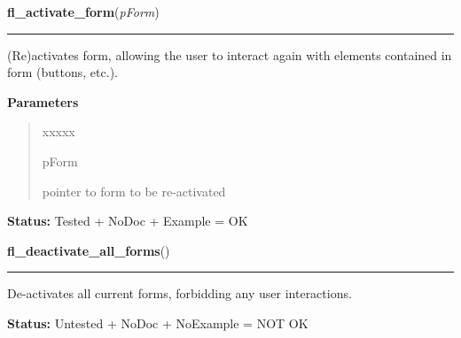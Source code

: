 \hspace{.8\funcindent}\begin{boxedminipage}{\funcwidth}

    \raggedright \textbf{fl\_activate\_form}(\textit{pForm})

    \vspace{-1.5ex}

    \rule{\textwidth}{0.5\fboxrule}
\setlength{\parskip}{2ex}
    (Re)activates form, allowing the user to interact again with elements 
    contained in form (buttons, etc.).

\setlength{\parskip}{1ex}
      \textbf{Parameters}
      \vspace{-1ex}

      \begin{quote}
        \begin{Ventry}{xxxxx}

          \item[pForm]

          pointer to form to be re-activated

        \end{Ventry}

      \end{quote}

\textbf{Status:} Tested + NoDoc + Example = OK



    \end{boxedminipage}

    \label{xformslib:library:fl_deactivate_all_forms}

    \vspace{0.5ex}

\hspace{.8\funcindent}\begin{boxedminipage}{\funcwidth}

    \raggedright \textbf{fl\_deactivate\_all\_forms}()

    \vspace{-1.5ex}

    \rule{\textwidth}{0.5\fboxrule}
\setlength{\parskip}{2ex}
    De-activates all current forms, forbidding any user interactions.

\setlength{\parskip}{1ex}
\textbf{Status:} Untested + NoDoc + NoExample = NOT OK



    \end{boxedminipage}

